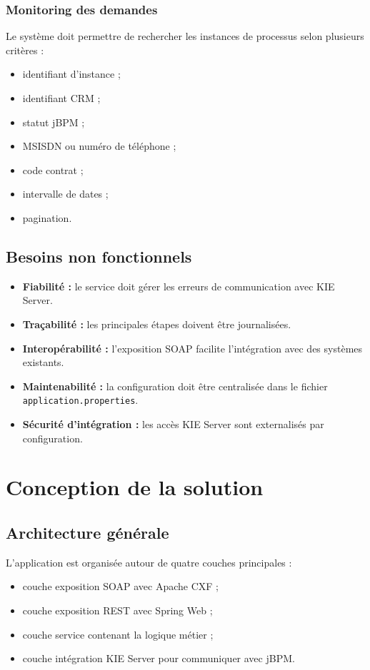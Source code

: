 \documentclass[12pt,a4paper]{report}
\begin{document}
\subsection{Monitoring des demandes}
Le système doit permettre de rechercher les instances de processus selon plusieurs critères :
\begin{itemize}
    \item identifiant d'instance ;
    \item identifiant CRM ;
    \item statut jBPM ;
    \item MSISDN ou numéro de téléphone ;
    \item code contrat ;
    \item intervalle de dates ;
    \item pagination.
\end{itemize}

\section{Besoins non fonctionnels}
\begin{itemize}
    \item \textbf{Fiabilité :} le service doit gérer les erreurs de communication avec KIE Server.
    \item \textbf{Traçabilité :} les principales étapes doivent être journalisées.
    \item \textbf{Interopérabilité :} l'exposition SOAP facilite l'intégration avec des systèmes existants.
    \item \textbf{Maintenabilité :} la configuration doit être centralisée dans le fichier \texttt{application.properties}.
    \item \textbf{Sécurité d'intégration :} les accès KIE Server sont externalisés par configuration.
\end{itemize}

\chapter{Conception de la solution}
\section{Architecture générale}
L'application est organisée autour de quatre couches principales :
\begin{itemize}
    \item couche exposition SOAP avec Apache CXF ;
    \item couche exposition REST avec Spring Web ;
    \item couche service contenant la logique métier ;
    \item couche intégration KIE Server pour communiquer avec jBPM.
\end{itemize}
\end{document}
